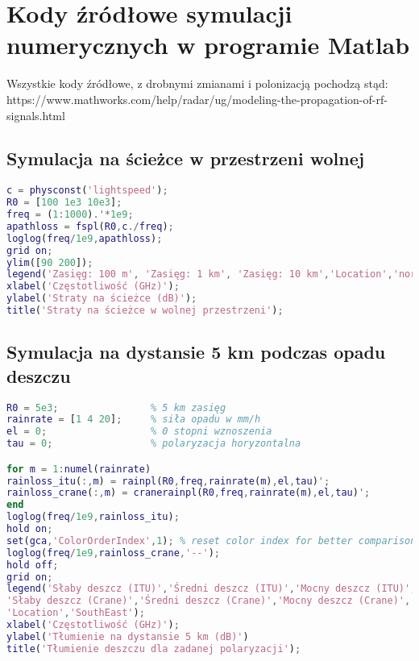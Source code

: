 \chapter{Kody źródłowe symulacji numerycznych w programie Matlab}

Wszystkie kody źródłowe, z drobnymi zmianami i polonizacją pochodzą stąd: https://www.mathworks.com/help/radar/ug/modeling-the-propagation-of-rf-signals.html

\section{Symulacja na ścieżce w przestrzeni wolnej}
\begin{lstlisting}[language=matlab, xleftmargin=0pt, backgroundcolor={\color{white}}, caption={}, frame=""]
c = physconst('lightspeed');
R0 = [100 1e3 10e3];
freq = (1:1000).'*1e9;
apathloss = fspl(R0,c./freq);
loglog(freq/1e9,apathloss);
grid on;
ylim([90 200]);
legend('Zasięg: 100 m', 'Zasięg: 1 km', 'Zasięg: 10 km','Location','northwest');
xlabel('Częstotliwość (GHz)');
ylabel('Straty na ścieżce (dB)');
title('Straty na ścieżce w wolnej przestrzeni');
\end{lstlisting}

\section{Symulacja na dystansie 5 km podczas opadu deszczu}
\begin{lstlisting}[language=matlab, xleftmargin=0pt, backgroundcolor={\color{white}}, caption={}, frame=""]
R0 = 5e3;                % 5 km zasięg
rainrate = [1 4 20];     % siła opadu w mm/h
el = 0;                  % 0 stopni wznoszenia
tau = 0;                 % polaryzacja horyzontalna

for m = 1:numel(rainrate)
rainloss_itu(:,m) = rainpl(R0,freq,rainrate(m),el,tau)';
rainloss_crane(:,m) = cranerainpl(R0,freq,rainrate(m),el,tau)';
end
loglog(freq/1e9,rainloss_itu);
hold on;
set(gca,'ColorOrderIndex',1); % reset color index for better comparison
loglog(freq/1e9,rainloss_crane,'--');
hold off;
grid on;
legend('Słaby deszcz (ITU)','Średni deszcz (ITU)','Mocny deszcz (ITU)',...
'Słaby deszcz (Crane)','Średni deszcz (Crane)','Mocny deszcz (Crane)', ...
'Location','SouthEast');
xlabel('Częstotliwość (GHz)');
ylabel('Tłumienie na dystansie 5 km (dB)')
title('Tłumienie deszczu dla zadanej polaryzacji');
\end{lstlisting}


